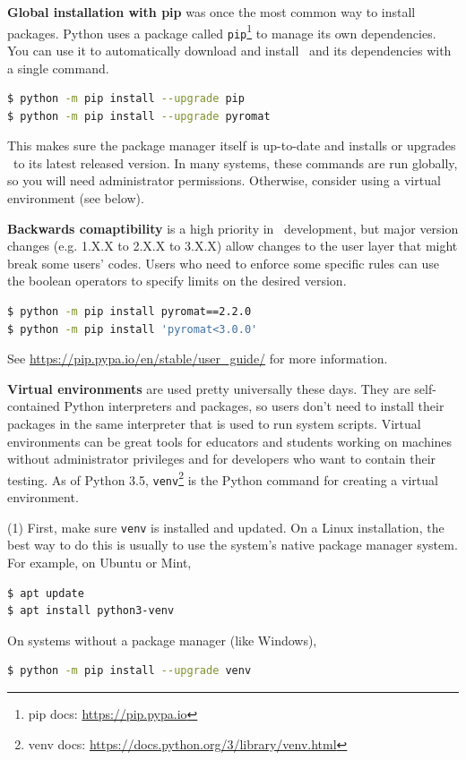 \textbf{Global installation with pip} was once the most common way to install packages.  Python uses a package called \texttt{pip}\footnote{pip docs: \url{https://pip.pypa.io}} to manage its own dependencies.  You can use it to automatically download and install \PM\ and its dependencies with a single command.
\begin{lstlisting}[language=bash]
$ python -m pip install --upgrade pip
$ python -m pip install --upgrade pyromat
\end{lstlisting}
This makes sure the package manager itself is up-to-date and installs or upgrades \PM\ to its latest released version.  In many systems, these commands are run globally, so you will need administrator permissions.  Otherwise, consider using a virtual environment (see below).

\textbf{Backwards comaptibility} is a high priority in \PM\ development, but major version changes (e.g. 1.X.X to 2.X.X to 3.X.X) allow changes to the user layer that might break some users' codes.  Users who need to enforce some specific rules can use the boolean operators to specify limits on the desired version.  
\begin{lstlisting}[language=bash]
$ python -m pip install pyromat==2.2.0
$ python -m pip install 'pyromat<3.0.0'
\end{lstlisting}
See \url{https://pip.pypa.io/en/stable/user_guide/} for more information.

\textbf{Virtual environments} are used pretty universally these days.  They are self-contained Python interpreters and packages, so users don't need to install their packages in the same interpreter that is used to run system scripts.  Virtual environments can be great tools for educators and students working on machines without administrator privileges and for developers who want to contain their testing.  As of Python 3.5, \texttt{venv}\footnote{venv docs: \url{https://docs.python.org/3/library/venv.html}} is the Python command for creating a virtual environment.

(1) First, make sure \texttt{venv} is installed and updated.  On a Linux installation, the best way to do this is usually to use the system's native package manager system.  For example, on Ubuntu or Mint, 
\begin{lstlisting}[language=bash]
$ apt update
$ apt install python3-venv
\end{lstlisting}
On systems without a package manager (like Windows),
\begin{lstlisting}[language=bash]
$ python -m pip install --upgrade venv
\end{lstlisting}

